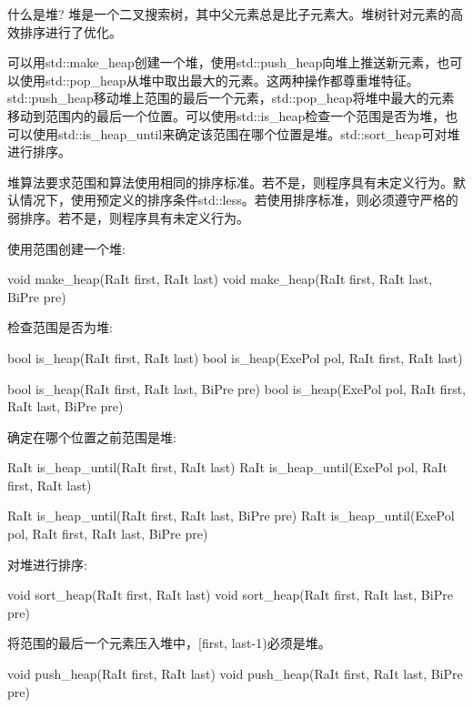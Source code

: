

\begin{myTip}{什么是堆?}
堆是一个二叉搜索树，其中父元素总是比子元素大。堆树针对元素的高效排序进行了优化。
\end{myTip}

可以用std::make\_heap创建一个堆，使用std::push\_heap向堆上推送新元素，也可以使用std::pop\_heap从堆中取出最大的元素。这两种操作都尊重堆特征。std::push\_heap移动堆上范围的最后一个元素，std::pop\_heap将堆中最大的元素移动到范围内的最后一个位置。可以使用std::is\_heap检查一个范围是否为堆，也可以使用std::is\_heap\_until来确定该范围在哪个位置是堆。std::sort\_heap可对堆进行排序。

堆算法要求范围和算法使用相同的排序标准。若不是，则程序具有未定义行为。默认情况下，使用预定义的排序条件std::less。若使用排序标准，则必须遵守严格的弱排序。若不是，则程序具有未定义行为。

使用范围创建一个堆:

\begin{cpp}
void make_heap(RaIt first, RaIt last)
void make_heap(RaIt first, RaIt last, BiPre pre)
\end{cpp}

检查范围是否为堆:

\begin{cpp}
bool is_heap(RaIt first, RaIt last)
bool is_heap(ExePol pol, RaIt first, RaIt last)

bool is_heap(RaIt first, RaIt last, BiPre pre)
bool is_heap(ExePol pol, RaIt first, RaIt last, BiPre pre)
\end{cpp}

确定在哪个位置之前范围是堆:

\begin{cpp}
RaIt is_heap_until(RaIt first, RaIt last)
RaIt is_heap_until(ExePol pol, RaIt first, RaIt last)

RaIt is_heap_until(RaIt first, RaIt last, BiPre pre)
RaIt is_heap_until(ExePol pol, RaIt first, RaIt last, BiPre pre)
\end{cpp}

对堆进行排序:

\begin{cpp}
void sort_heap(RaIt first, RaIt last)
void sort_heap(RaIt first, RaIt last, BiPre pre)
\end{cpp}

将范围的最后一个元素压入堆中，[first, last-1)必须是堆。

\begin{cpp}
void push_heap(RaIt first, RaIt last)
void push_heap(RaIt first, RaIt last, BiPre pre)
\end{cpp}

